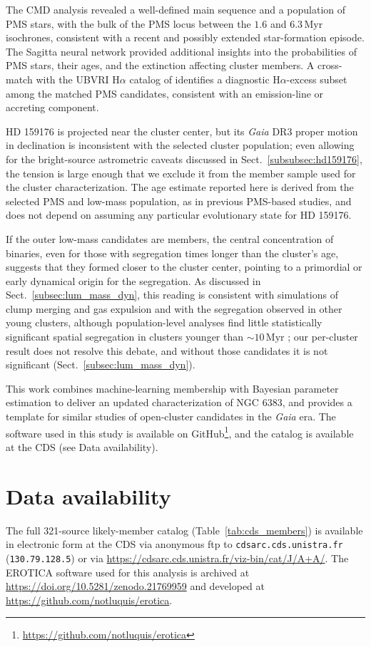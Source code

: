 \documentclass{aa}
\begin{document}
The CMD analysis revealed a well-defined main sequence and a population of PMS stars, with the bulk of the PMS locus between the $1.6$ and $6.3\,\mathrm{Myr}$ isochrones, consistent with a recent and possibly extended star-formation episode. The Sagitta neural network provided additional insights into the probabilities of PMS stars, their ages, and the extinction affecting cluster members. A cross-match with the UBVRI H$\alpha$ catalog of \citet{2010AA...511A..25R} identifies a diagnostic H$\alpha$-excess subset among the matched PMS candidates, consistent with an emission-line or accreting component.

HD 159176 is projected near the cluster center, but its \textit{Gaia} DR3 proper motion in declination is inconsistent with the selected cluster population; even allowing for the bright-source astrometric caveats discussed in Sect.~\ref{subsubsec:hd159176}, the tension is large enough that we exclude it from the member sample used for the cluster characterization. The age estimate reported here is derived from the selected PMS and low-mass population, as in previous PMS-based studies, and does not depend on assuming any particular evolutionary state for HD 159176.

If the outer low-mass candidates are members, the central concentration of binaries, even for those with segregation times longer than the cluster's age, suggests that they formed closer to the cluster center, pointing to a primordial or early dynamical origin for the segregation. As discussed in Sect.~\ref{subsec:lum_mass_dyn}, this reading is consistent with simulations of clump merging and gas expulsion and with the segregation observed in other young clusters, although population-level analyses find little statistically significant spatial segregation in clusters younger than $\sim10\,\mathrm{Myr}$ \citep{2026AJ....171..236Z}; our per-cluster result does not resolve this debate, and without those candidates it is not significant (Sect.~\ref{subsec:lum_mass_dyn}).

This work combines machine-learning membership with Bayesian parameter estimation to deliver an updated characterization of NGC 6383, and provides a template for similar studies of open-cluster candidates in the \textit{Gaia} era. The software used in this study is available on GitHub\footnote{\href{https://github.com/notluquis/erotica}{https://github.com/notluquis/erotica}}, and the catalog is available at the CDS (see Data availability).

\section*{Data availability}
The full 321-source likely-member catalog (Table~\ref{tab:cds_members}) is available in electronic form at the CDS via anonymous ftp to \texttt{cdsarc.cds.unistra.fr} (\texttt{130.79.128.5}) or via \url{https://cdsarc.cds.unistra.fr/viz-bin/cat/J/A+A/}. The \textsc{EROTICA} software used for this analysis is archived at \url{https://doi.org/10.5281/zenodo.21769959} and developed at \url{https://github.com/notluquis/erotica}.
\end{document}
